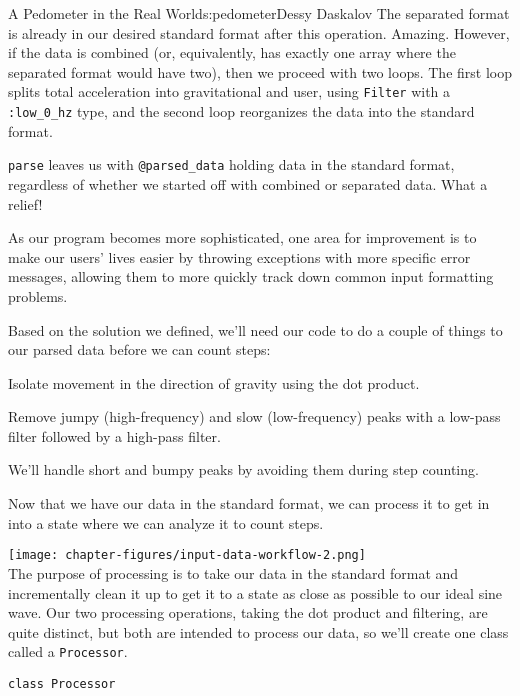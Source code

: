 \begin{aosachapter}{A Pedometer in the Real World}{s:pedometer}{Dessy Daskalov}
The separated format is already in our desired standard format after
this operation. Amazing. However, if the data is combined (or,
equivalently, has exactly one array where the separated format would
have two), then we proceed with two loops. The first loop splits total
acceleration into gravitational and user, using \texttt{Filter} with a
\texttt{:low\_0\_hz} type, and the second loop reorganizes the data into
the standard format.

\texttt{parse} leaves us with \texttt{@parsed\_data} holding data in the
standard format, regardless of whether we started off with combined or
separated data. What a relief!

As our program becomes more sophisticated, one area for improvement is
to make our users' lives easier by throwing exceptions with more
specific error messages, allowing them to more quickly track down common
input formatting problems.

\label{processing}

Based on the solution we defined, we'll need our code to do a couple of
things to our parsed data before we can count steps:

\begin{aosaenumerate}
\def\labelenumi{\arabic{enumi}.}

\item
  Isolate movement in the direction of gravity using the dot product.
\item
  Remove jumpy (high-frequency) and slow (low-frequency) peaks with a
  low-pass filter followed by a high-pass filter.
\end{aosaenumerate}

We'll handle short and bumpy peaks by avoiding them during step
counting.

Now that we have our data in the standard format, we can process it to
get in into a state where we can analyze it to count steps.

\texttt{[image: chapter-figures/input-data-workflow-2.png]}\\ The
purpose of processing is to take our data in the standard format and
incrementally clean it up to get it to a state as close as possible to
our ideal sine wave. Our two processing operations, taking the dot
product and filtering, are quite distinct, but both are intended to
process our data, so we'll create one class called a \texttt{Processor}.

\begin{verbatim}
class Processor


\end{verbatim}
\end{aosachapter}
